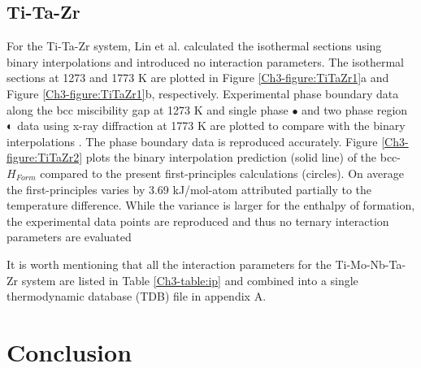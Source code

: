 \subsection{Ti-Ta-Zr}

For the Ti-Ta-Zr system, Lin et al. \cite{Lin1996} calculated the isothermal sections using binary interpolations and introduced no interaction parameters. The isothermal sections at 1273 and 1773 K are plotted in Figure \ref{Ch3-figure:TiTaZr1}a and Figure \ref{Ch3-figure:TiTaZr1}b, respectively. Experimental phase boundary data along the bcc miscibility gap at 1273 K and single phase $\bullet$ and two phase region $\LEFTcircle$ data using x-ray diffraction at 1773 K are plotted to compare with the binary interpolations \cite{Lin1996,Hoch1964}. The phase boundary data is reproduced accurately. Figure \ref{Ch3-figure:TiTaZr2} plots the binary interpolation prediction (solid line) of the bcc-$H_{Form}$ compared to the present first-principles calculations (circles). On average the first-principles varies by 3.69 kJ/mol-atom attributed partially to the temperature difference. While the variance is larger for the enthalpy of formation, the experimental data points \cite{Lin1996} are reproduced and thus no ternary interaction parameters are evaluated

It is worth mentioning that all the interaction parameters for the Ti-Mo-Nb-Ta-Zr system are listed in Table \ref{Ch3-table:ip} and combined into a single thermodynamic database (TDB) file in appendix A.

\section{Conclusion}

